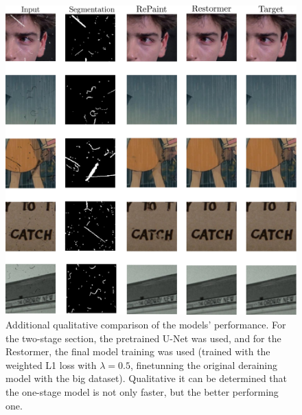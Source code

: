 \documentclass[10pt,a4paper,twocolumn,twoside]{article}
\begin{document}
\begin{figure}[h]
    \centering
    \includegraphics[width=0.8\linewidth]{img/AnnexA.pdf}
    \caption{Additional qualitative comparison of the models' performance. For the two-stage section, the pretrained U-Net was used, and for the Restormer, the final model training was used (trained with the weighted L1 loss with $\lambda = 0.5$, finetunning the original deraining model with the big dataset). Qualitative it can be determined that the one-stage model is not only faster, but the better performing one. }
    \label{fig:anex5}
\end{figure}
\end{document}
